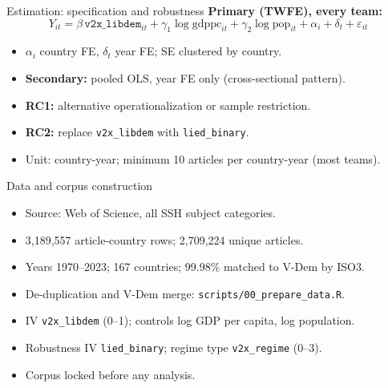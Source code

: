 \documentclass[aspectratio=169,11pt]{beamer}
\begin{document}
\begin{frame}{Estimation: specification and robustness}
  \hypertarget{ap:spec}{}
  \small
  \textbf{Primary (TWFE), every team:}
  \begin{equation*}
    Y_{it} = \beta\,\texttt{v2x\_libdem}_{it} + \gamma_1 \log\text{gdppc}_{it}
      + \gamma_2 \log\text{pop}_{it} + \alpha_i + \delta_t + \varepsilon_{it}
  \end{equation*}
  \begin{itemize}
    \item $\alpha_i$ country FE, $\delta_t$ year FE; SE clustered by country.
    \item \textbf{Secondary:} pooled OLS, year FE only (cross-sectional pattern).
    \item \textbf{RC1:} alternative operationalization or sample restriction.
    \item \textbf{RC2:} replace \texttt{v2x\_libdem} with \texttt{lied\_binary}.
    \item Unit: country-year; minimum 10 articles per country-year (most teams).
  \end{itemize}
  \vfill
  \hfill\hyperlink{ap:toc}{}
\end{frame}

\begin{frame}{Data and corpus construction}
  \hypertarget{ap:data}{}
  \small
  \begin{itemize}
    \item Source: Web of Science, all SSH subject categories.
    \item 3{,}189{,}557 article-country rows; 2{,}709{,}224 unique articles.
    \item Years 1970--2023; 167 countries; 99.98\% matched to V-Dem by ISO3.
    \item De-duplication and V-Dem merge: \texttt{scripts/00\_prepare\_data.R}.
    \item IV \texttt{v2x\_libdem} (0--1); controls log GDP per capita, log population.
    \item Robustness IV \texttt{lied\_binary}; regime type \texttt{v2x\_regime} (0--3).
    \item Corpus locked before any analysis.
  \end{itemize}
  \vfill
  \hfill\hyperlink{ap:toc}{}
\end{frame}
\end{document}
